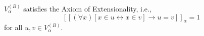 $V_{\alpha}^{(B)}$ satisfies the Axiom of Extensionality, i.e.,
$$[\![(\forall x)[x \in u \leftrightarrow x \in v] \rightarrow u = v]\!]_{\alpha} = 1$$
for all $u, v \in V_{\alpha}^{(B)}$.
